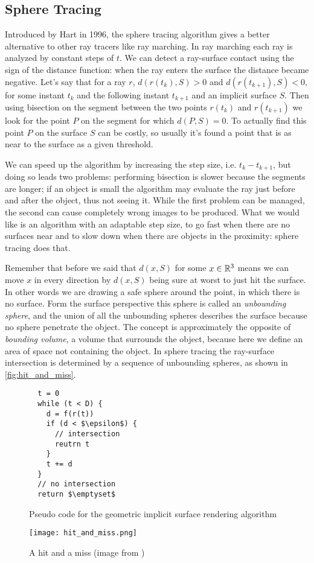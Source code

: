 \subsection{Sphere Tracing}
Introduced by Hart\cite{hart1996} in 1996, the sphere tracing algorithm gives a better alternative to other ray tracers like ray marching.
In ray marching each ray is analyzed by constant steps of $t$.
We can detect a ray-surface contact using the sign of the distance function: when the ray enters the surface the distance became negative.
Let's say that for a ray $r$, $d(r(t_k),S) > 0$ and $d(r(t_{k+1}),S) < 0$, for some instant $t_k$ and the following instant $t_{k+1}$ and an implicit surface $S$.
Then using bisection on the segment between the two points $r(t_k)$ and $r(t_{k+1})$
we look for the point $P$ on the segment for which $d(P,S) = 0$.
To actually find this point $P$ on the surface $S$ can be costly, so usually it's found a point that is as near to the surface as a given threshold.

We can speed up the algorithm by increasing the step size, i.e. $t_{k} - t_{k+1}$, but doing so leads two problems:
performing bisection is slower because the segments are longer;
if an object is small the algorithm may evaluate the ray just before and after the object, thus not seeing it.
While the first problem can be managed, the second can cause completely wrong images to be produced.
What we would like is an algorithm with an adaptable step size, to go fast when there are no surfaces near and to slow down when there are objects in the proximity: sphere tracing does that.

Remember that before we said that $d(x,S)$ for some $x \in \mathbb{R}^3$ means we can move $x$ in every direction by $d(x,S)$ being sure at worst to just hit the surface.
In other words we are drawing a safe sphere around the point, in which there is no surface.
Form the surface perspective this sphere is called an \emph{unbounding sphere}\cite{hart1996}, and the union of all the unbounding spheres describes the surface because no sphere penetrate the object.
The concept is approximately the opposite of \emph{bounding volume}, a volume that surrounds the object, because here we define an area of space not containing the object.
In sphere tracing the ray-surface intersection is determined by a sequence of unbounding spheres, as shown in \autoref{fig:hit_and_miss}.
\begin{figure}[!htb]
  \begin{lstlisting}
  t = 0
  while (t < D) {
    d = f(r(t))
    if (d < $\epsilon$) {
      // intersection
      reutrn t
    }
    t += d
  }
  // no intersection
  return $\emptyset$
  \end{lstlisting}
  \caption{Pseudo code for the geometric implicit surface rendering algorithm}
  \label{pscode:sphere_tracing}
\endminipage\hfill
{}
  \texttt{[image: hit\_and\_miss.png]}
  \caption{A hit and a miss (image from \cite{hart1996})}
  \label{fig:hit_and_miss}
\endminipage
\end{figure}

